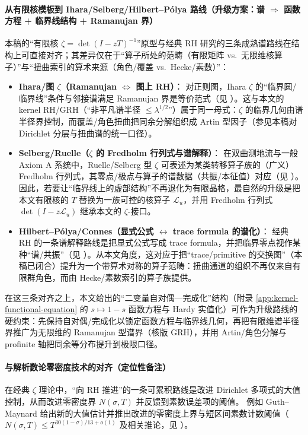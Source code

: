 \paragraph{从有限核模板到 Ihara/Selberg/Hilbert--P{\'o}lya 路线（升级方案：谱 \(\Rightarrow\) 函数方程 + 临界线结构 + Ramanujan 界）}
本稿的“有限核 \(\zeta=\det(I-zT)^{-1}\)”原型与经典 RH 研究的三条成熟谱路线在结构上可直接对齐；其差异仅在于“算子所处的范畴（有限矩阵 vs.\ 无限维核算子）”与“扭曲索引的算术来源（角色/覆盖 vs.\ Hecke/素数）”：
\begin{itemize}
  \item \textbf{Ihara/图 \(\zeta\)（Ramanujan \(\Leftrightarrow\) 图上 RH）}：
  对正则图，Ihara \(\zeta\) 的“临界圆/临界线”条件与邻接谱满足 Ramanujan 界是等价范式（见 \cite{TerrasZetaGraphs,StarkTerras1996GraphCoverings}）。这与本文的 kernel RH/GRH（“非平凡谱半径 \(\le \lambda^{1/2}\)”）属于同一母式：\(\zeta\) 的临界几何由谱半径界控制，而覆盖/角色扭曲把同余分解组织成 Artin 型因子（参见本稿对 Dirichlet 分层与扭曲谱的统一口径）。
  \item \textbf{Selberg/Ruelle（\(\zeta\) 的 Fredholm 行列式与谱解释）}：
  在双曲测地流与一般 Axiom A 系统中，Ruelle/Selberg 型 \(\zeta\) 可表述为某类转移算子族的（广义）Fredholm 行列式，其零点/极点与算子的谱数据（共振/本征值）对应（见 \cite{Ruelle1976ZetaExpanding,ParryPollicott1990Zeta,Fried1986RuelleSelberg}）。因此，若要让“临界线上的虚部结构”不再退化为有限晶格，最自然的升级是把本文有限核的 \(T\) 替换为一族可控的核算子 \(\mathcal{L}_u\)，并用 Fredholm 行列式 \(\det(I-z\mathcal{L}_u)\) 继承本文的 \(\zeta\)-接口。
  \item \textbf{Hilbert--P{\'o}lya/Connes（显式公式 \(\leftrightarrow\) trace formula 的谱化）}：
  经典 RH 的一条谱解释路线是把显式公式写成 trace formula，并把临界零点视作某种“谱/共振”（见 \cite{Connes1999TraceFormulaNCG}）。从本文角度，这对应于把“trace/primitive 的交换图”（本稿已闭合）提升为一个带算术对称的算子范畴：扭曲通道的组织不再仅来自有限群角色，而由 Hecke/素数索引的算子族提供。
\end{itemize}
在这三条对齐之上，本文给出的“二变量自对偶—完成化”结构（附录 \ref{app:kernel-functional-equation} 的 \(s\mapsto 1-s\) 函数方程与 Hardy 实值化）可作为升级路线的硬约束：先保持自对偶/完成化以锁定函数方程与临界线几何，再把有限维谱半径界推广为无限维的 Ramanujan 型谱界（核版 GRH），并用 Artin/角色分解与 profinite 轴把同余等分布提升到极限口径。

\paragraph{与解析数论零密度技术的对齐（定位性备注）}
在经典 \(\zeta\) 理论中，“向 RH 推进”的一条可累积路线是改进 Dirichlet 多项式的大值控制，从而改进零密度界 \(N(\sigma,T)\) 并反馈到素数误差项的阈值。
例如 Guth--Maynard 给出新的大值估计并推出改进的零密度上界与短区间素数计数阈值（\(N(\sigma,T)\le T^{30(1-\sigma)/13+o(1)}\) 及相关推论，见 \cite{GuthMaynard2024LargeValues}）。

